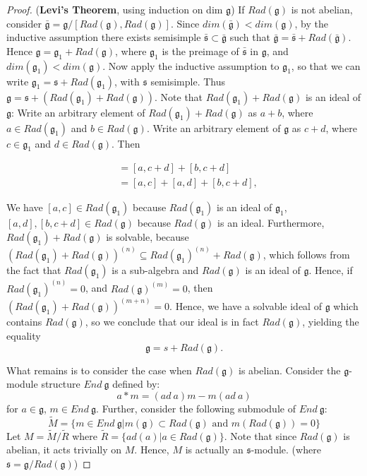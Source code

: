 \documentclass{amsart}
\newcommand*{\g}{\mathfrak{g}}
\newcommand{\s}{{\mathfrak{s}}}
\begin{document}
\begin{proof} (\textbf{Levi's Theorem}, using induction on dim $\g$)
If $Rad(\g)$ is not abelian, consider $\bar{\g} = \g/[Rad(\g), Rad(\g)]$.
Since $dim(\bar{\g}) < dim(\g)$, by the inductive assumption there exists 
semisimple $\bar{\s} \subset \bar{\g}$ such that $\bar{\g} = \bar{\s} + Rad(\bar{\g})$.
Hence $\g = \g_1 + Rad(\g)$, where $\g_1$ is the preimage of $\bar{\s}$ in $\g$, and $dim(\g_1) < dim(\g)$.
Now apply the inductive assumption to $\g_1$, so that we can write $\g_1 = \s + Rad(\g_1)$, with $\s$ semisimple.
Thus $\g = \s + (Rad(\g_1) + Rad(\g))$.  Note that $Rad(\g_1) +
Rad(\g)$ is an ideal of $\g$:  Write an arbitrary element of $Rad(\g_1) +
Rad(\g)$  as
$a+b$, where $a \in Rad(\g_1)$ and $b \in Rad(\g)$.  Write an
arbitrary element of $\g$ as $c+d$, where $c \in \g_1$ and $d \in
Rad(\g)$.  Then 

\begin{align*}
[a+b,c+d] &= [a, c+d] + [b, c+d] \\
&= [a, c] + [a,d] + [b, c+d],
\end{align*}

\noindent We have $[a,c] \in Rad(\g_1)$ because $Rad(\g_1)$ is an
ideal of $\g_1$, $[a,d],[b,c+d] \in Rad(\g)$ because $Rad(\g)$ is an
ideal.  Furthermore, $Rad(\g_1) +
Rad(\g)$ is solvable, because $(Rad(\g_1) +
Rad(\g))^{(n)} \subseteq Rad(\g_1)^{(n)} + Rad(\g)$, 
which follows from the fact that $Rad(\g_1)$ is a sub-algebra 
and $Rad(\g)$ is an ideal of $\g$.  Hence, if $Rad(\g_1)^{(n)} = 0$, 
and $Rad(\g)^{(m)} = 0$, then $(Rad(\g_1) +
Rad(\g))^{(m+n)} = 0$.
Hence, we have a
solvable ideal of $\g$ which contains $Rad(\g)$, so we conclude that
our ideal is in fact $Rad(\g)$, yielding the equality $$\g = s + Rad(\g).$$

What remains is to consider the case when $Rad(\g)$ is abelian.
Consider the $\g$-module structure $End\ \g$ defined by:
$$a*m = (ad\ a)m - m(ad\ a)$$ for $a \in \g$, $m \in End\ \g$.
Further, consider the following submodule of $End\ \g$:
$$\tilde{M} = \{ m \in End\ \g | m(\g) \subset Rad(\g) \textrm{ and } m(Rad(\g)) = 0 \}$$
Let $M = \tilde{M}/\tilde{R}$ where $\tilde{R} = \{ ad(a) | a \in Rad(\g) \}$.
Note that since $Rad(\g)$ is abelian, it acts trivially on $M$. Hence,
$M$ is actually an $\s$-module. (where $\s = \g/Rad(\g)$)


\end{proof}
\end{document}
